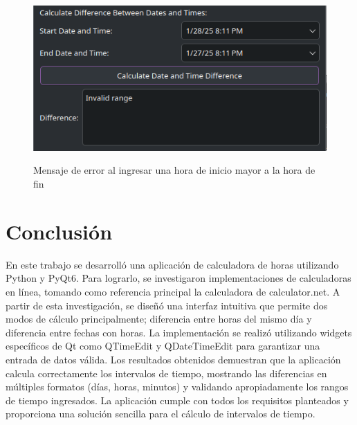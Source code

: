\documentclass[conference]{IEEEtran}
\begin{document}
    \begin{figure}[H]
        {\includegraphics[width=\breite\columnwidth]{images/error2.png}}
        \caption{Mensaje de error al ingresar una hora de inicio mayor a la hora de fin}
        \label{fig:error2}
    \end{figure}

\section{Conclusión}
    En este trabajo se desarrolló una aplicación de calculadora de horas utilizando Python y PyQt6. Para lograrlo, se investigaron implementaciones de calculadoras en línea, tomando como referencia principal la calculadora de calculator.net. A partir de esta investigación, se diseñó una interfaz intuitiva que permite dos modos de cálculo principalmente; diferencia entre horas del mismo día y diferencia entre fechas con horas. La implementación se realizó utilizando widgets específicos de Qt como QTimeEdit y QDateTimeEdit para garantizar una entrada de datos válida. Los resultados obtenidos demuestran que la aplicación calcula correctamente los intervalos de tiempo, mostrando las diferencias en múltiples formatos (días, horas, minutos) y validando apropiadamente los rangos de tiempo ingresados. La aplicación cumple con todos los requisitos planteados y proporciona una solución sencilla para el cálculo de intervalos de tiempo.

\nocite{*}
\printbibliography
\end{document}
